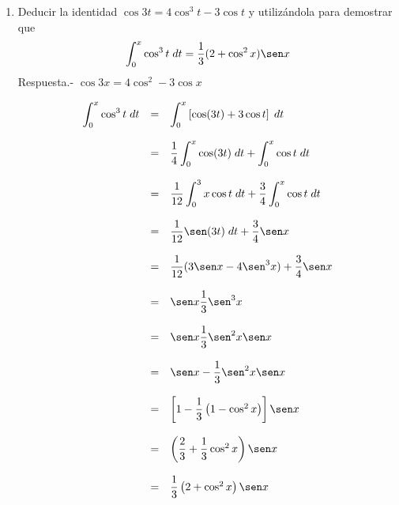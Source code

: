 \begin{enumerate}[\bfseries 1.]
\begin{enumerate}[\bfseries (a)]
	\item Deducir la identidad $\cos 3t = 4\cos^3 t - 3\cos t$ y utilizándola para demostrar que 
	    $$\int_0^x \cos^3 t \; dt = \frac{1}{3}(2+\cos^2 x)\sen x$$
	    Respuesta.-\; $\cos3 x = 4\cos^2 - 3\cos x$

	    $$\begin{array}{rcl}
		\displaystyle\int_0^x \cos^3 t\; dt&=&\displaystyle\int_0^x \left[\cos(3t) + 3\cos t\right]\; dt\\\\
						   &=&\dfrac{1}{4}\displaystyle\int_0^x \cos(3t)\; dt + \displaystyle\int_0^x \cos t \; dt\\\\
						   &=&\dfrac{1}{12}\displaystyle\int_0^3x \cos t \; dt + \dfrac{3}{4}\displaystyle\int_0^x \cos t \; dt\\\\
						   &=&\dfrac{1}{12} \sen(3t) \; dt + \dfrac{3}{4}\sen x\\\\
						   &=&\dfrac{1}{12}(3\sen x - 4 \sen^3 x) + \dfrac{3}{4}\sen x\\\\
						   &=&\sen x \dfrac{1}{3}\sen^3 x\\\\
						   &=&\sen x \dfrac{1}{3}\sen^2x \sen x\\\\
						   &=&\sen x - \dfrac{1}{3}\sen^2x \sen x\\\\
						   &=&\left[1 - \dfrac{1}{3}\left(1-\cos^2 x\right)\right]\sen x\\\\
						   &=&\left(\dfrac{2}{3}+\dfrac{1}{3}\cos^2 x\right)\sen x\\\\
						   &=&\dfrac{1}{3}\left(2+\cos^2 x\right)\sen x\\\\
		\end{array}$$

    \end{enumerate}


\end{enumerate}
